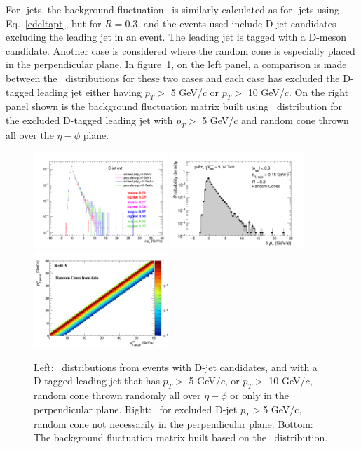 For \Dzero-jets, the background fluctuation \deltapt\ is similarly calculated as for \Dstar-jets using Eq.~\ref{edeltapt}, but for $R=0.3$, 
and the events used include D-jet candidates excluding the leading jet in an event. The leading jet is tagged with a D-meson candidate.  
Another case is considered where the random cone is especially placed in the perpendicular plane.
In figure~\ref{fig:DeltaPt_Dzero}, on the left panel, a comparison is made between the \deltapt\ distributions for these two cases and each case has excluded the D-tagged leading jet either having $p_{T}>$ 5 GeV/$c$ or $p_{T}>$ 10 GeV/$c$.
On the right panel shown is the background fluctuation matrix built using \deltapt\ distribution for the excluded D-tagged leading jet with $p_{T}>$ 5 GeV/$c$ 
and random cone thrown all over the $\eta-\phi$ plane.
\begin{figure}[bth]
\centering
\includegraphics[width=0.45\textwidth]{pPbplotsD0/Default/ResponseMatrix/RandomCones/plotsComparison/DjetEvt_com2}
\includegraphics[width=0.45\textwidth]{pPbplotsD0/Default/ResponseMatrix/BkgRM03/plots/DeltaPt_Djet5Excl.png}
\includegraphics[width=0.45\textwidth]{pPbplotsD0/Default/ResponseMatrix/BkgRM03/plots/BkgMatrix_Djet5Excl.png}
\caption{Left: \deltapt\ distributions from events with D-jet candidates, and with a D-tagged leading jet that has $p_{T}>$ 5 GeV/$c$, or $p_{T}>$ 10 GeV/$c$, random cone thrown randomly all over $\eta-\phi$ or only in the perpendicular plane. Right: \deltapt\ for excluded D-jet $p_{T}>$5 GeV/c, random cone not necessarily in the perpendicular plane. Bottom: The background fluctuation matrix built based on the \deltapt\ distribution.}
\label{fig:DeltaPt_Dzero}%
\end{figure}
